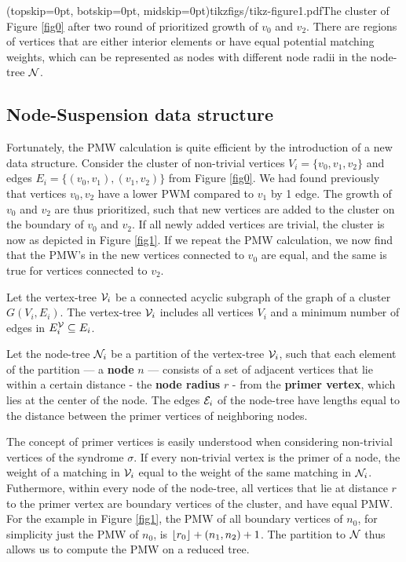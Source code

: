\Figure[htb](topskip=0pt, botskip=0pt, midskip=0pt){tikzfigs/tikz-figure1.pdf}{The cluster of Figure \ref{fig0} after two round of prioritized growth of $v_0$ and $v_2$. There are regions of vertices that are either interior elements or have equal potential matching weights, which can be represented as nodes with different node radii in the node-tree $\mathcal{N}$. \label{fig1}}

\subsection{Node-Suspension data structure}\label{sec:nodeset}

Fortunately, the PMW calculation is quite efficient by the introduction of a new data structure. Consider the cluster of non-trivial vertices $V_i=\{v_0,v_1,v_2\}$ and edges $E_i = \{(v_0,v_1), (v_1, v_2)\}$ from Figure \ref{fig0}. We had found previously that vertices $v_0, v_2$ have a lower PWM compared to $v_1$ by 1 edge. The growth of $v_0$ and $v_2$ are thus prioritized, such that new vertices are added to the cluster on the boundary of $v_0$ and $v_2$. If all newly added vertices are trivial, the cluster is now as depicted in Figure \ref{fig1}. If we repeat the PMW calculation, we now find that the PMW's in the new vertices connected to $v_0$ are equal, and the same is true for vertices connected to $v_2$. 
\begin{definition}
    Let the vertex-tree $\mathcal{V}_i$ be a connected acyclic subgraph of the graph of a cluster $G(V_i, E_i)$.   The vertex-tree $\mathcal{V}_i$ includes all vertices $V_i$ and a minimum number of edges in $E^{\mathcal{V}}_i \subseteq E_i$. 
\end{definition}
\begin{definition}
  Let the node-tree $\mathcal{N}_i$ be a partition of the vertex-tree $\mathcal{V}_i$, such that each element of the partition --- a \textbf{node} $n$ --- consists of a set of adjacent vertices that lie within a certain distance - the \textbf{node radius} $r$ - from the \textbf{primer vertex}, which lies at the center of the node. The edges $\mathcal{E}_i$ of the node-tree have lengths equal to the distance between the primer vertices of neighboring nodes. 
\end{definition}

The concept of primer vertices is easily understood when considering non-trivial vertices of the syndrome $\sigma$. If every non-trivial vertex is the primer of a node, the weight of a matching in $\mathcal{V}_i$ equal to the weight of the same matching in $\mathcal{N}_i$. Futhermore, within every node of the node-tree, all vertices that lie at distance $r$ to the primer vertex are boundary vertices of the cluster, and have equal PMW. For the example in Figure \ref{fig1}, the PMW of all boundary vertices of $n_0$, for simplicity just the PMW of $n_0$, is ${\left \lfloor r_0 \right \rfloor } + (n_1, n_2) + 1$. The partition to $\mathcal{N}$ thus allows us to compute the PMW on a reduced tree. 

